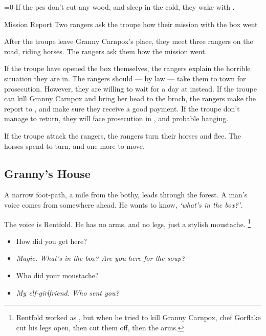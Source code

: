 \documentclass[10pt,twoside]{book}
\begin{document}
\ifnum\value{temperature}=0
  If the \glspl{pc} don't cut any wood, and sleep in the cold, they wake with .
\fi

{Mission Report}%
{Two \glspl{ranger} ask the troupe how their mission with the box went}%

After the troupe leave Granny Carnpox's place, they meet three \glspl{ranger} on the road, riding horses.
The \glspl{ranger} ask them how the mission went.

\humansoldier[\npc{\T[3]\Hu\M\F}{\composeHumanName, \composeHumanName, \& \composeHumanName}]


If the troupe have opened the box themselves, the \glspl{ranger} explain the horrible situation they are in.
The \glspl{ranger} should --- by law --- take them to town for prosecution.
However, they are willing to wait for a day at  instead.
If the troupe can kill Granny Carnpox and bring her head to the \gls{broch}, the \glspl{ranger} make the report to , and make sure they receive a good payment.
If the troupe don't manage to return, they will face prosecution in , and probable hanging.

If the troupe attack the \glspl{ranger}, the \glspl{ranger} turn their horses and flee.
The horses spend  to turn, and one more to move.

\subsection{Granny's House}

\begin{boxtext}
  A narrow foot-path, a mile from the \gls{bothy}, leads through the forest.
  A man's voice comes from somewhere ahead.
  He wants to know, \textit{`what's in the box?'}.
\end{boxtext}

The voice is Rentfold.
He has no arms, and no legs, just a stylish moustache.%
\footnote{Rentfold worked as , but when he tried to kill Granny Carnpox, chef Gorflake cut his legs open, then cut them off, then the arms.}

\begin{itemize}
  \item\sf
  How did you get here?
  \item\it
  Magic.
  What's in the box?
  Are you here for the soup?
  \item\sf
  Who did your moustache?
  \item\it
  My elf-girlfriend.
  Who sent you?
\end{itemize}
\end{document}
